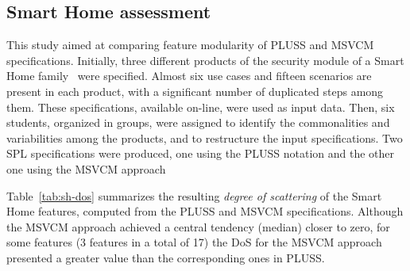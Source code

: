 \subsection{Smart Home assessment}

This study aimed at comparing feature modularity of PLUSS and MSVCM
specifications. Initially, three different products of the security module of a
Smart Home family~\cite{Pohl:2005aa} were specified. Almost six use cases and
fifteen scenarios are present in each product, with a significant number of
duplicated steps among them. These specifications, available on-line, were used
as input data. Then, six students, organized in groups, were assigned to identify
the commonalities and variabilities among the products, and to restructure the
input specifications. Two SPL specifications were produced, one using the PLUSS
notation and the other one using the MSVCM approach




Table~\ref{tab:sh-dos} summarizes the resulting \emph{degree of scattering} of
the Smart Home features, computed from the PLUSS and MSVCM specifications.
Although the MSVCM approach achieved a central tendency (median) closer to
zero, for some features (3 features in a total of 17) the DoS for the MSVCM approach
presented a greater value than the corresponding ones in PLUSS.


